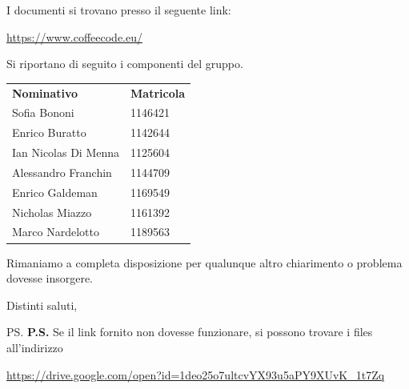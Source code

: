 \documentclass{letter}
\begin{document}
\begin{letter}{ }
I documenti si trovano presso il seguente link:
\begin{center}
  \centering
  \href{https://www.coffeecode.eu/}{https://www.coffeecode.eu/}
\end{center}
\newpage
Si riportano di seguito i componenti del gruppo.

\begin{center}
   \centering
   \begin{tabular}{ll}
     \textbf{Nominativo}        & \textbf{Matricola} \\
     Sofia Bononi              &  1146421 \\
     Enrico Buratto            &  1142644 \\
     Ian Nicolas Di Menna      &  1125604 \\
     Alessandro Franchin       &  1144709 \\
     Enrico Galdeman           &  1169549 \\
     Nicholas Miazzo           &  1161392 \\
     Marco Nardelotto          &  1189563 \\
   \end{tabular}
 \end{center}

Rimaniamo a completa disposizione per qualunque altro chiarimento o problema dovesse insorgere.

\closing{Distinti saluti,}

\ps
\textbf{P.S.} Se il link fornito non dovesse funzionare, si possono trovare i files all'indirizzo
\begin{center}
	\centering
	\href{https://drive.google.com/open?id=1deo25o7ultcvYX93u5aPY9XUvK_1t7Zq}{https://drive.google.com/open?id=1deo25o7ultcvYX93u5aPY9XUvK\_1t7Zq}
\end{center}

\end{letter}
\end{document}
